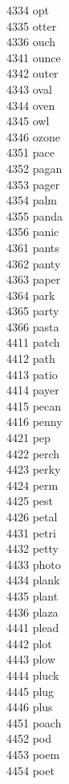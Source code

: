 4334 opt \\
4335 otter \\
4336 ouch \\
4341 ounce \\
4342 outer \\
4343 oval \\
4344 oven \\
4345 owl \\
4346 ozone \\
4351 pace \\
4352 pagan \\
4353 pager \\
4354 palm \\
4355 panda \\
4356 panic \\
4361 pants \\
4362 panty \\
4363 paper \\
4364 park \\
4365 party \\
4366 pasta \\
4411 patch \\
4412 path \\
4413 patio \\
4414 payer \\
4415 pecan \\
4416 penny \\
4421 pep \\
4422 perch \\
4423 perky \\
4424 perm \\
4425 pest \\
4426 petal \\
4431 petri \\
4432 petty \\
4433 photo \\
4434 plank \\
4435 plant \\
4436 plaza \\
4441 plead \\
4442 plot \\
4443 plow \\
4444 pluck \\
4445 plug \\
4446 plus \\
4451 poach \\
4452 pod \\
4453 poem \\
4454 poet \\
